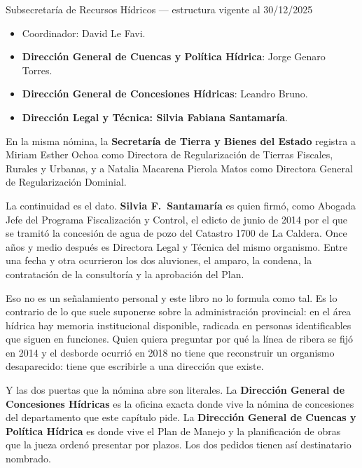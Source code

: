 \begin{ficha}{Subsecretaría de Recursos Hídricos --- estructura vigente al 30/12/2025}
\begin{itemize}[leftmargin=*,nosep]
\item Coordinador: David Le Favi.
\item \textbf{Dirección General de Cuencas y Política Hídrica}: Jorge Genaro Torres.
\item \textbf{Dirección General de Concesiones Hídricas}: Leandro Bruno.
\item \textbf{Dirección Legal y Técnica: Silvia Fabiana Santamaría}.
\end{itemize}
En la misma nómina, la \textbf{Secretaría de Tierra y Bienes del Estado} registra a Miriam Esther Ochoa como Directora de Regularización de Tierras Fiscales, Rurales y Urbanas, y a Natalia Macarena Pierola Matos como Directora General de Regularización Dominial.
\end{ficha}

\begin{cautela}
La continuidad es el dato. \textbf{Silvia F.\ Santamaría} es quien firmó, como Abogada Jefe del Programa Fiscalización y Control, el edicto de junio de 2014 por el que se tramitó la concesión de agua de pozo del Catastro 1700 de La Caldera. Once años y medio después es Directora Legal y Técnica del mismo organismo. Entre una fecha y otra ocurrieron los dos aluviones, el amparo, la condena, la contratación de la consultoría y la aprobación del Plan.

Eso no es un señalamiento personal y este libro no lo formula como tal. Es lo contrario de lo que suele suponerse sobre la administración provincial: en el área hídrica hay memoria institucional disponible, radicada en personas identificables que siguen en funciones. Quien quiera preguntar por qué la línea de ribera se fijó en 2014 y el desborde ocurrió en 2018 no tiene que reconstruir un organismo desaparecido: tiene que escribirle a una dirección que existe.

Y las dos puertas que la nómina abre son literales. La \textbf{Dirección General de Concesiones Hídricas} es la oficina exacta donde vive la nómina de concesiones del departamento que este capítulo pide. La \textbf{Dirección General de Cuencas y Política Hídrica} es donde vive el Plan de Manejo y la planificación de obras que la jueza ordenó presentar por plazos. Los dos pedidos tienen así destinatario nombrado.
\end{cautela}

